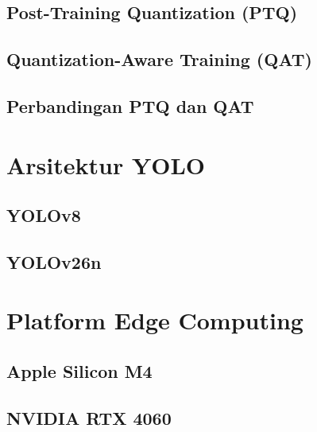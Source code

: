 \documentclass[12pt, a4paper]{report}
\begin{document}
\subsection{Post-Training Quantization (PTQ)}


\subsection{Quantization-Aware Training (QAT)}


\subsection{Perbandingan PTQ dan QAT}


\section{Arsitektur YOLO}

\subsection{YOLOv8}

\subsection{YOLOv26n}

\section{Platform Edge Computing}

\subsection{Apple Silicon M4}

\subsection{NVIDIA RTX 4060}
\end{document}
